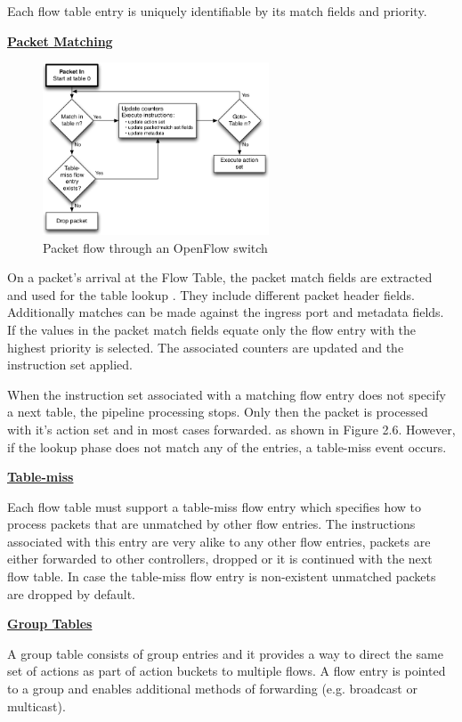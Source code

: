 Each flow table entry is uniquely identifiable by its match fields and priority. 


\underline{\textbf{Packet Matching}}

\begin{figure}[H]
\centering
\includegraphics[width=0.6\textwidth]{images/fundamentals/openflow_packet_matching.png}
\caption{Packet flow through an OpenFlow switch}
\end{figure}

On a packet's arrival at the Flow Table, the packet match fields are extracted and used for the table lookup \cite{ofspecification}. They include different packet header fields. Additionally matches can be made against the ingress port and metadata fields.
If the values in the packet match fields equate  only the flow entry with the highest priority is selected. The associated counters are updated and the instruction set applied.

When the instruction set associated with a matching flow entry does not specify a next table, the pipeline processing stops. Only then the packet is processed with it's action set and in most cases forwarded. as shown in Figure 2.6.
However, if the lookup phase does not match any of the entries, a table-miss event occurs.


\underline{\textbf{Table-miss}}

Each flow table must support a table-miss flow entry which specifies how to process packets that are unmatched by other flow entries. The instructions associated with this entry are very alike to any other flow entries, packets are either forwarded to other controllers, dropped or it is continued with the next flow table. In case the table-miss flow entry is non-existent unmatched packets are dropped by default. 


\underline{\textbf{Group Tables}}

A group table consists of group entries and it provides a way to direct the same set of actions as part of action buckets to multiple flows. A flow entry is pointed to a group and enables additional methods of forwarding (e.g. broadcast or multicast).


